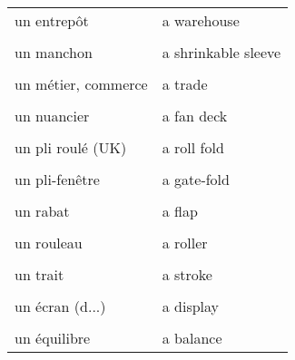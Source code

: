 \documentclass[
  10pt,
]{article}
\begin{document}
\begin{longtable}{ll}
un entrepôt & a warehouse\\

\cellcolor{gray!6}{un logiciel} & \cellcolor{gray!6}{a software}\\

un manchon & a shrinkable sleeve\\

\cellcolor{gray!6}{un massicot} & \cellcolor{gray!6}{a trimmer}\\

un métier, commerce & a trade\\

\cellcolor{gray!6}{un niveau} & \cellcolor{gray!6}{a level}\\

un nuancier & a fan deck\\

\cellcolor{gray!6}{un plateau} & \cellcolor{gray!6}{a tray}\\

un pli roulé (UK) & a roll fold\\

\cellcolor{gray!6}{un pli roulé (US)} & \cellcolor{gray!6}{a tri/letter fold}\\

un pli-fenêtre & a gate-fold\\

\cellcolor{gray!6}{un pli} & \cellcolor{gray!6}{a fold}\\

un rabat & a flap\\

\cellcolor{gray!6}{un revêtement} & \cellcolor{gray!6}{a coating}\\

un rouleau & a roller\\

\cellcolor{gray!6}{un stage} & \cellcolor{gray!6}{an internship}\\

un trait & a stroke\\

\cellcolor{gray!6}{un volume} & \cellcolor{gray!6}{a form}\\

un écran (d...) & a display\\

\cellcolor{gray!6}{un écran (m...)} & \cellcolor{gray!6}{a monitor}\\

un équilibre & a balance\\


\end{longtable}
\end{document}
